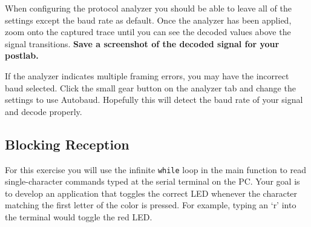 \documentclass[11pt,fleqn]{book} %
\begin{document}
When configuring the protocol analyzer you should be able to leave all of the settings except the baud rate as default. Once the analyzer has been applied, zoom onto the captured trace until you can see the decoded values above the signal transitions. \textbf{Save a screenshot of the decoded signal for your postlab. }

If the analyzer indicates multiple framing errors, you may have the incorrect baud selected. Click the small gear button on the analyzer tab and change the settings to use Autobaud. Hopefully this will detect the baud rate of your signal and decode properly. 



\subsection{Blocking Reception}

For this exercise you will use the infinite \texttt{while} loop in the main function to read single-character commands typed at the serial terminal on the PC. Your goal is to develop an application that toggles the correct LED whenever the character matching the first letter of the color is pressed. For example, typing an `r' into the terminal would toggle the red LED. 
\end{document}
